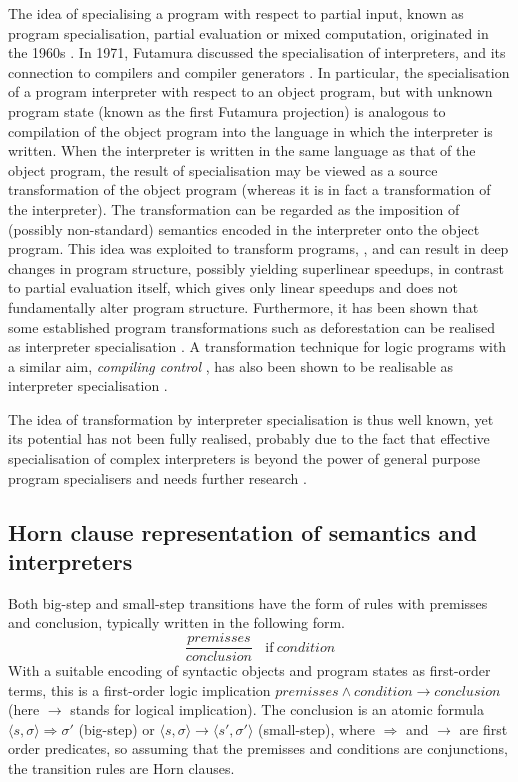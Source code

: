 \documentclass{llncs}
\begin{document}
The idea of specialising a program with respect to partial input,  known as program specialisation, partial evaluation or mixed computation, 
originated in the 1960s \cite{Lombardi,Ershov}.  In 1971, Futamura discussed the specialisation of interpreters, and its connection to compilers and compiler 
generators \cite{Futamura71}.  In particular, the specialisation of a program interpreter with respect to an object program,  but with unknown
program state (known as the first Futamura projection) is analogous to compilation of the object 
program into the language in which the interpreter is written.  
When the interpreter is written in the same language as that of the object program,
the result of specialisation may be viewed as a source transformation of the object program 
(whereas it is in fact a transformation of the interpreter). 
The transformation can be regarded as the imposition of (possibly non-standard) semantics encoded in the
interpreter onto the object program. 
This idea was exploited to transform programs, \cite{Gallagher,Turchin,Glueck,Jones,Giacobazzi}, and can result in deep changes in program structure, 
possibly yielding superlinear speedups, in contrast to partial evaluation itself, which gives only linear speedups and does not fundamentally alter program
structure.  Furthermore, it has been shown that some established program transformations such as deforestation
can be realised as interpreter specialisation \cite{Glueck}.  A transformation technique for logic programs with a similar 
aim, \emph{compiling control} \cite{BruynoogheDeS},
has also been shown to be realisable as interpreter specialisation \cite{Nys}.

The idea of transformation by interpreter specialisation is thus well known, yet its potential has not been fully realised, probably due to the 
fact that effective specialisation of complex interpreters is beyond the power of general purpose program specialisers and needs 
further research \cite{GallagherGlueck}.

\subsection{Horn clause representation of semantics and interpreters}

Both big-step and small-step transitions have the form of rules with premisses and conclusion, typically written in the following form.
\[
\dfrac{\mathit{premisses}} 
{\mathit{conclusion}} 
~~~~\mathrm{if }~ \mathit{condition}
\]
With a suitable encoding of syntactic objects and program states as first-order terms, this is a first-order logic implication
$\mathit{premisses} \wedge \mathit{condition} \rightarrow \mathit{conclusion}$ 
(here $\rightarrow$ stands for logical implication).
The conclusion is an atomic formula
$\langle s, \sigma\rangle \Rightarrow \sigma'$ (big-step) or $\langle s, \sigma\rangle \rightarrow \langle s',\sigma'\rangle$ (small-step),
where $\Rightarrow$ and $\rightarrow$ are first order predicates, so assuming that the premisses and conditions are conjunctions,
the transition rules are Horn clauses.
\end{document}
